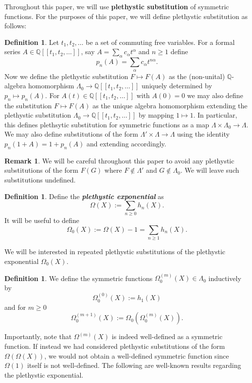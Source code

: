 \documentclass[12pt,reqno]{amsart}
\theoremstyle{definition}
\newtheorem{defn}[thm]{Definition}
\newtheorem{remark}{Remark}
\begin{document}
Throughout this paper, we will use \textbf{plethystic substitution} of symmetric functions. For the purposes of this paper, we will define plethystic substitution as follows:

\begin{defn}
    Let $t_1,t_2,\ldots$ be a set of commuting free variables. For a formal series $A \in \mathbb{Q}[[t_1,t_2,\ldots ]]$, say $A= \sum_{\alpha} c_{\alpha} t^{\alpha}$ and $n \geq 1$ define 
    $$p_n(A) = \sum_{\alpha} c_{\alpha} t^{n\alpha}.$$ Now we define the plethystic substitution $F \mapsto F(A)$ as the (non-unital) $\mathbb{Q}$-algebra homomorphism $\Lambda_0 \rightarrow \mathbb{Q}[[t_1,t_2,\ldots ]]$ uniquely determined by $p_n \mapsto p_n(A).$ For $A(t) \in \mathbb{Q}[[t_1,t_2,\ldots ]]$ with $A(0) = 0$ we may also define the substitution $F \mapsto F(A)$ as the unique algebra homomorphism extending the plethystic substitution $\Lambda_0 \rightarrow \mathbb{Q}[[t_1,t_2,\ldots ]]$ by mapping $1 \mapsto 1.$ In particular, this defines plethsytic substitution for symmetric functions as a map $\Lambda \times \Lambda_0 \rightarrow \Lambda.$ We may also define substitutions of the form $\Lambda' \times \Lambda \rightarrow \Lambda$ using the identity $p_n(1+A) = 1 + p_n(A)$ and extending accordingly. 
\end{defn}

\begin{remark}
    We will be careful throughout this paper to avoid any plethystic substitutions of the form $F(G)$ where $F \notin \Lambda'$ and $G \notin \Lambda_0.$ We will leave such substitutions undefined.  
\end{remark}

\begin{defn}
Define the \textit{\textbf{plethystic exponential}} as
    $$\Omega(X):= \sum_{n \geq 0} h_n(X).$$ It will be useful to define $$\Omega_0(X) := \Omega(X) -1 = \sum_{n \geq 1} h_n(X).$$
\end{defn}

We will be interested in repeated plethystic substitutions of the plethystic exponential $ \Omega_0(X)$. 

\begin{defn}
We define the symmetric functions $\Omega^{(m)}_0(X) \in \Lambda_0$ inductively by
    $$\Omega_0^{(0)}(X) := h_1(X)$$ and for $m \geq 0$
    $$\Omega_0^{(m+1)}(X) := \Omega_0\left( \Omega_0^{(m)}(X)\right).$$
\end{defn}

Importantly, note that $\Omega^{(m)}(X)$ is indeed well-defined as a symmetric function. If instead we had considered plethystic substitutions of the form $\Omega(\Omega(X))$, we would not obtain a well-defined symmetric function since $\Omega(1)$ itself is not well-defined. The following are well-known results regarding the plethystic exponential.
\end{document}
